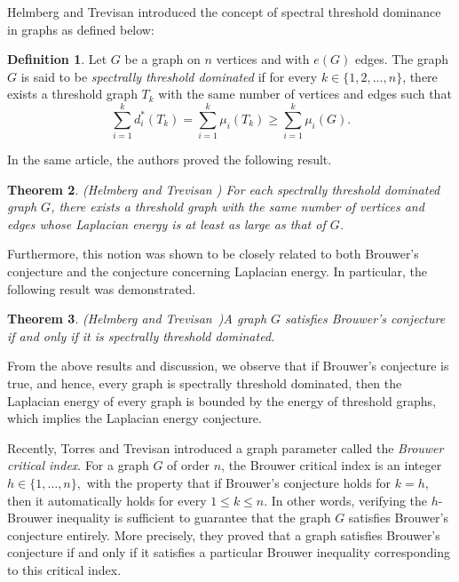 \documentclass[12pt]{article}
\theoremstyle{plain}
\newtheorem{theorem}{Theorem}[section]
\theoremstyle{definition}
\newtheorem{definition}[theorem]{Definition}
\begin{document}
Helmberg and Trevisan \cite{Helm2017} introduced the concept of spectral threshold dominance in graphs as defined below:
 
\begin{definition}
Let $G$ be a graph on $n$ vertices and with $e(G)$ edges. The graph $G$ is said to be {\em spectrally threshold dominated} if for every $k\in\{1,2,\ldots,n\}$, there exists a threshold graph $T_k$ with the same number of vertices and edges such that
$$\sum_{i=1}^{k}d_i^*(T_k)=\sum_{i=1}^{k}\mu_i(T_k)\geq\sum_{i=1}^{k}\mu_i(G).$$
\end{definition}

In the same article, the authors proved the following result.

\begin{theorem} {\rm(Helmberg and Trevisan \cite{Helm2017})} \label{Hel2017}
For each spectrally threshold dominated graph $G$, there exists a threshold graph with the same number of vertices and edges whose Laplacian energy is at least as large as that of $G$.
\end{theorem}
Furthermore, this notion was shown to be closely related to both Brouwer’s conjecture and the conjecture concerning Laplacian energy. In particular, the following result was demonstrated. 
\begin{theorem} {\rm (Helmberg and Trevisan~\cite{Helm2017})}\label{bro=sthre}
A graph $G$ satisfies Brouwer’s conjecture if and only if it is spectrally threshold dominated.
\end{theorem}

From the above results and discussion, we observe that if Brouwer’s conjecture is true, and hence, every graph is spectrally threshold dominated, then the Laplacian energy of every graph is bounded by the energy of threshold graphs, which implies the Laplacian energy conjecture.

Recently, Torres and  Trevisan \cite{torres} introduced a graph parameter called the \emph{Brouwer critical index}. For a graph $G$ of order $n$, the Brouwer critical index is an integer
$
h \in \{1,\ldots,n\},
$
with the property that if Brouwer’s conjecture holds for $k=h$, then it automatically holds for every
$
1 \leq k \leq n.
$
In other words, verifying the $h$-Brouwer inequality is sufficient to guarantee that the graph $G$ satisfies Brouwer’s conjecture entirely. More precisely, they proved that a graph satisfies Brouwer’s conjecture if and only if it satisfies a particular Brouwer inequality corresponding to this critical index.
 
\end{document}
